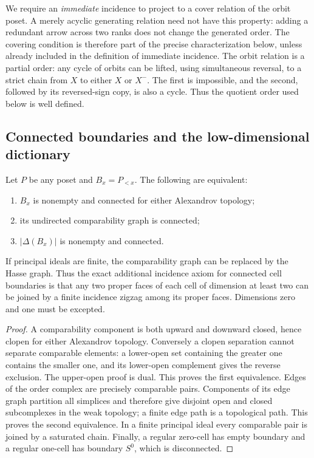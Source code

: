 We require an \emph{immediate} incidence to project to a cover relation
of the orbit poset. A merely acyclic generating relation need not have
this property: adding a redundant arrow across two ranks does not change
the generated order. The covering condition is therefore part of the
precise characterization below, unless already included in the definition
of immediate incidence.
The orbit relation is a partial order: any cycle of orbits can be lifted,
using simultaneous reversal, to a strict chain from $X$ to either $X$
or $X^-$. The first is impossible, and the second, followed by its
reversed-sign copy, is also a cycle. Thus the quotient order used below
is well defined.

\subsection{Connected boundaries and the low-dimensional dictionary}

\begin{theorem}\label{SA21-C03}
Let $P$ be any poset and $B_x=P_{<x}$. The following are equivalent:
\begin{enumerate}
\item $B_x$ is nonempty and connected for either Alexandrov topology;
\item its undirected comparability graph is connected;
\item $|\Delta(B_x)|$ is nonempty and connected.
\end{enumerate}
If principal ideals are finite, the comparability graph can be replaced
by the Hasse graph. Thus the exact additional incidence axiom for connected
cell boundaries is that any two proper faces of each cell of dimension
at least two can be joined by a finite incidence zigzag among its proper
faces. Dimensions zero and one must be excepted.
\end{theorem}
\begin{proof}
A comparability component is both upward and downward closed, hence
clopen for either Alexandrov topology. Conversely a clopen separation
cannot separate comparable elements: a lower-open set containing the
greater one contains the smaller one, and its lower-open complement
gives the reverse exclusion. The upper-open proof is dual. This proves
the first equivalence. Edges of the order complex are precisely comparable
pairs. Components of its edge graph partition all simplices and therefore
give disjoint open and closed subcomplexes in the weak topology; a finite
edge path is a topological path. This proves the second equivalence.
In a finite principal ideal every comparable pair is joined by a
saturated chain. Finally, a regular zero-cell has empty boundary and a
regular one-cell has boundary $S^0$, which is disconnected.
\end{proof}


